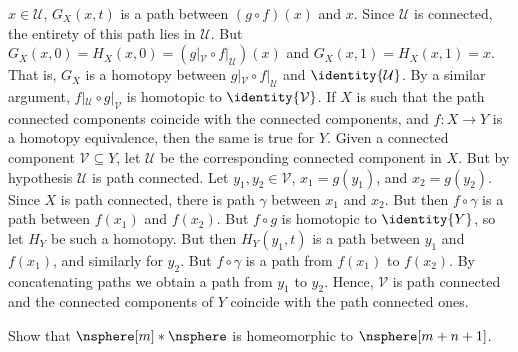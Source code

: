\documentclass{book}                                                           %
\begin{document}
\begin{solution}
            $x\in\mathcal{U}$, $G_{X}(x,t)$ is a path between
            $(g\circ{f})(x)$ and $x$. Since $\mathcal{U}$ is connected, the entirety
            of this path lies in $\mathcal{U}$. But
            $G_{X}(x,0)=H_{X}(x,0)=(g|_{\mathcal{V}}\circ{f}|_{\mathcal{U}})(x)$
            and $G_{X}(x,1)=H_{X}(x,1)=x$. That is, $G_{X}$ is a homotopy between
            $g|_{\mathcal{V}}\circ{f}|_{\mathcal{U}}$ and $\identity{\mathcal{U}}$.
            By a similar argument, $f|_{\mathcal{U}}\circ{g}|_{\mathcal{V}}$ is
            homotopic to $\identity{\mathcal{V}}$. If $X$ is such that the path
            connected components coincide with the connected components, and
            $f:X\rightarrow{Y}$ is a homotopy equivalence, then the same is true for
            $Y$. Given a connected component $\mathcal{V}\subseteq{Y}$, let
            $\mathcal{U}$ be the corresponding connected component in $X$. But by
            hypothesis $\mathcal{U}$ is path connected. Let
            $y_{1},y_{2}\in\mathcal{V}$, $x_{1}=g(y_{1})$, and $x_{2}=g(y_{2})$.
            Since $X$ is path connected, there is path $\gamma$ between $x_{1}$ and
            $x_{2}$. But then $f\circ\gamma$ is a path between $f(x_{1})$ and
            $f(x_{2})$. But $f\circ{g}$ is homotopic to $\identity{Y}$, so let
            $H_{Y}$ be such a homotopy. But then $H_{Y}(y_{1},t)$ is a path between
            $y_{1}$ and $f(x_{1})$, and similarly for $y_{2}$. But $f\circ\gamma$
            is a path from $f(x_{1})$ to $f(x_{2})$. By concatenating paths we
            obtain a path from $y_{1}$ to $y_{2}$. Hence, $\mathcal{V}$ is path
            connected and the connected components of $Y$ coincide with the path
            connected ones.
        \end{solution}
        \begin{problem}
            Show that $\nsphere[m]*\nsphere$ is homeomorphic to $\nsphere[m+n+1]$.
        \end{problem}
\end{document}
